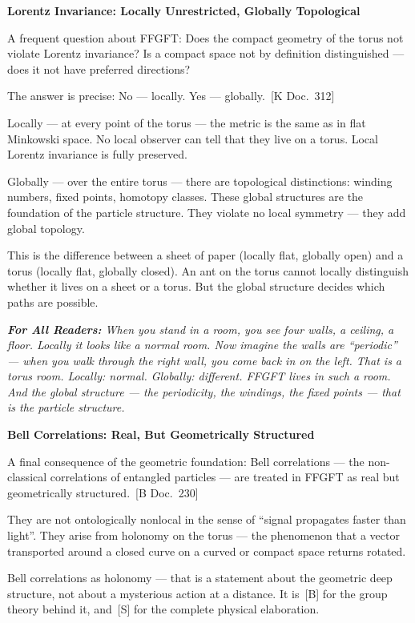 \documentclass[11pt,oneside]{book}
\newcommand{\status}[1]{\penalty10000\,{\scriptsize\textcolor{gray!60}{[#1]}}}
\newenvironment{laierspur}{%
  \par\vspace{4pt}%
  \noindent\small\itshape\color{blue!60!black}%
  \textbf{For All Readers:}\enspace\ignorespaces}{%
  \par\vspace{4pt}\normalsize\normalfont\normalcolor}
\begin{document}
\textbf{Lorentz Invariance: Locally Unrestricted, Globally Topological}

A frequent question about FFGFT: Does the compact geometry of the torus not
violate Lorentz invariance? Is a compact space not by definition
distinguished — does it not have preferred directions?

The answer is precise: No — locally. Yes — globally. \status{K Doc.~312}

Locally — at every point of the torus — the metric is the same as in flat
Minkowski space. No local observer can tell that they live on a torus. Local
Lorentz invariance is fully preserved.

Globally — over the entire torus — there are topological distinctions:
winding numbers, fixed points, homotopy classes. These global structures are
the foundation of the particle structure. They violate no local symmetry —
they add global topology.

This is the difference between a sheet of paper (locally flat, globally open)
and a torus (locally flat, globally closed). An ant on the torus cannot
locally distinguish whether it lives on a sheet or a torus. But the global
structure decides which paths are possible.

\begin{laierspur}
When you stand in a room, you see four walls, a ceiling, a floor. Locally
it looks like a normal room. Now imagine the walls are \enquote{periodic} — when you
walk through the right wall, you come back in on the left. That is a torus
room. Locally: normal. Globally: different. FFGFT lives in such a room. And
the global structure — the periodicity, the windings, the fixed points —
that is the particle structure.
\end{laierspur}

\textbf{Bell Correlations: Real, But Geometrically Structured}

A final consequence of the geometric foundation: Bell correlations — the
non-classical correlations of entangled particles — are treated in FFGFT as
real but geometrically structured. \status{B Doc.~230}

They are not ontologically nonlocal in the sense of \enquote{signal propagates
faster than light}. They arise from holonomy on the torus — the phenomenon
that a vector transported around a closed curve on a curved or compact space
returns rotated.

Bell correlations as holonomy — that is a statement about the geometric deep
structure, not about a mysterious action at a distance. It is \status{B} for the
group theory behind it, and \status{S} for the complete physical elaboration.
\end{document}
